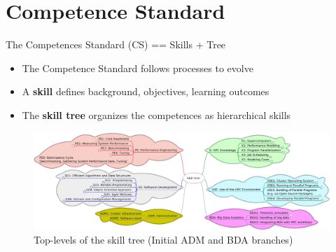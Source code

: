 \documentclass[compress,aspectratio=169]{beamer}
\begin{document}
\section{Competence Standard}

\begin{frame}{The Competences Standard (CS) == Skills + Tree}
	\begin{itemize}
    \item The Competence Standard follows processes to evolve
		\item A \textbf{skill} defines background, objectives, learning outcomes
		\item The \textbf{skill tree} organizes the competences as hierarchical skills
	\end{itemize}

	\begin{figure}
		\includegraphics[width=\textwidth]{skill-tree}
		\vspace*{-2em}
		\caption{Top-levels of the skill tree (Initial ADM and BDA branches)}
	\end{figure}
\end{frame}
\end{document}
